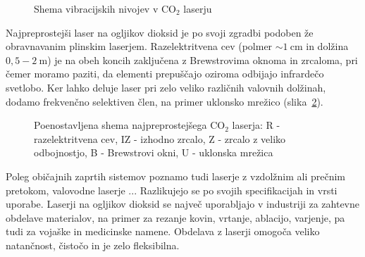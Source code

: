 \begin{figure}[h]
\centering
\def\svgwidth{95truemm} 

\caption{Shema vibracijskih nivojev v CO$_2$ laserju}
\label{fig:CO2E}
\end{figure}

Najpreprostejši laser na ogljikov dioksid  
je po svoji zgradbi podoben že obravnavanim plinskim laserjem. 
Razelektritvena cev (polmer $\sim 1~\si{\centi\metre}$ in dolžina $0,5-2~\si{\metre}$) 
je na obeh koncih zaključena z Brewstrovima oknoma in zrcaloma, pri čemer moramo paziti,
da elementi prepuščajo oziroma odbijajo infrardečo svetlobo. Ker lahko deluje
laser pri zelo veliko različnih valovnih dolžinah, dodamo frekvenčno selektiven
člen, na primer uklonsko mrežico (slika~\ref{fig:CO2S}).

\begin{figure}[h]
\centering
\def\svgwidth{100truemm} 

\caption{Poenostavljena shema najpreprostejšega CO$_2$ laserja: R - razelektritvena cev, 
IZ - izhodno zrcalo, Z - zrcalo z veliko odbojnostjo, B - Brewstrovi okni, 
U - uklonska mrežica
}
\label{fig:CO2S}
\end{figure}

Poleg običajnih zaprtih sistemov poznamo tudi laserje z vzdolžnim ali prečnim pretokom, 
valovodne laserje ... Razlikujejo se po svojih specifikacijah in vrsti uporabe.
Laserji na ogljikov dioksid se največ uporabljajo v industriji za zahtevne 
obdelave materialov, na primer za rezanje 
kovin, vrtanje, ablacijo, varjenje, pa tudi za vojaške in medicinske namene.
Obdelava z laserji omogoča veliko natančnost, čistočo in je zelo fleksibilna.


